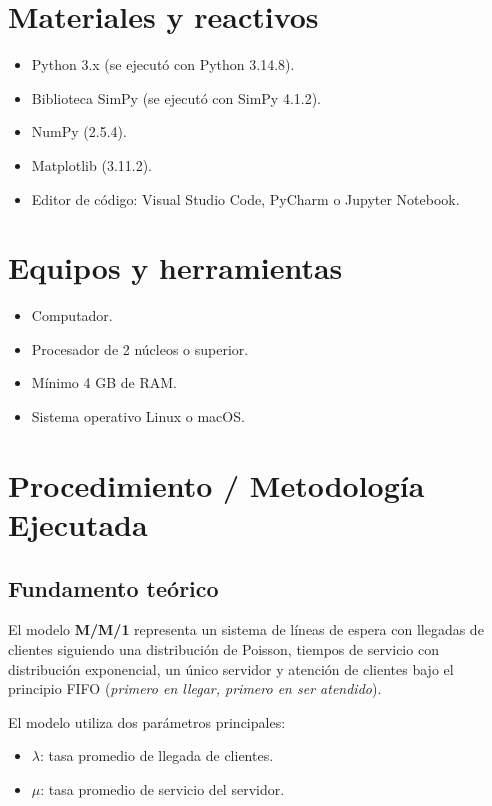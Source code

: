\documentclass[11pt,a4paper]{article}
\begin{document}
\section{Materiales y reactivos}
\begin{itemize}
    \item Python 3.x (se ejecutó con Python 3.14.8).
    \item Biblioteca SimPy (se ejecutó con SimPy 4.1.2).
    \item NumPy (2.5.4).
    \item Matplotlib (3.11.2).
    \item Editor de código: Visual Studio Code, PyCharm o Jupyter Notebook.
\end{itemize}

\section{Equipos y herramientas}
\begin{itemize}
    \item Computador.
    \item Procesador de 2 núcleos o superior.
    \item Mínimo 4 GB de RAM.
    \item Sistema operativo Linux o macOS.
\end{itemize}

\section{Procedimiento / Metodología Ejecutada}

\subsection{Fundamento teórico}

El modelo \textbf{M/M/1} representa un sistema de líneas de espera con llegadas de
clientes siguiendo una distribución de Poisson, tiempos de servicio con distribución
exponencial, un único servidor y atención de clientes bajo el principio FIFO
(\emph{primero en llegar, primero en ser atendido}).

El modelo utiliza dos parámetros principales:
\begin{itemize}
    \item $\lambda$: tasa promedio de llegada de clientes.
    \item $\mu$: tasa promedio de servicio del servidor.
\end{itemize}
\end{document}
